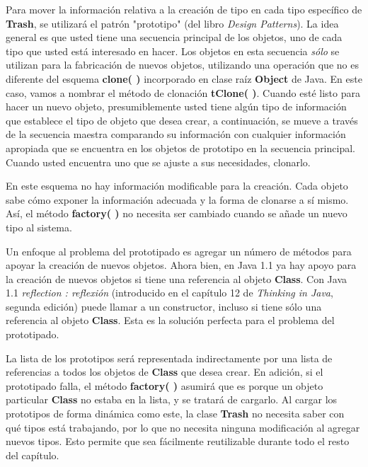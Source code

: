 \documentclass{article}
\begin{document}
Para mover la información relativa a la creación de tipo en cada tipo específico de \textbf{Trash}, se utilizará el patrón "prototipo" (del libro \textit{Design Patterns}). La idea general es que usted tiene una secuencia principal de los objetos, uno de cada tipo que usted está interesado en hacer. Los objetos en esta secuencia \textit{sólo} se utilizan para la fabricación de nuevos objetos, utilizando una operación que no es diferente del esquema \textbf{clone( )} incorporado en clase raíz \textbf{Object} de Java. En este caso, vamos a nombrar el método de clonación \textbf{tClone( )}. Cuando esté listo para hacer un nuevo objeto, presumiblemente usted tiene algún tipo de información que establece el tipo de objeto que desea crear, a continuación, se mueve a través de la secuencia maestra comparando su información con cualquier información apropiada que se encuentra en los objetos de prototipo en la secuencia principal. Cuando usted encuentra uno que se ajuste a sus necesidades, clonarlo.    \newline

En este esquema no hay información modificable para la creación. Cada objeto sabe cómo exponer la información adecuada y la forma de clonarse a sí mismo. Así, el método \textbf{factory( )} no necesita ser cambiado cuando se añade un nuevo tipo al sistema.     \newline

Un enfoque al problema del prototipado es agregar un número de métodos para apoyar la creación de nuevos objetos. Ahora bien, en Java 1.1 ya hay apoyo para la creación de nuevos objetos si tiene una referencia al objeto \textbf{Class}. Con Java 1.1 \textit{reflection :  reflexión} (introducido en el capítulo 12 de \textit{Thinking in Java}, segunda edición) puede llamar a un constructor, incluso si tiene sólo una referencia al objeto \textbf{Class}. Esta es la solución perfecta para el problema del prototipado.   \newline

La lista de los prototipos será representada indirectamente por una lista de referencias a todos los objetos de \textbf{Class} que desea crear. En adición, si el prototipado falla, el método \textbf{factory( )} asumirá que es porque un objeto particular \textbf{Class} no estaba en la lista, y se tratará de cargarlo. Al cargar los prototipos de forma dinámica como este, la clase \textbf{Trash} no necesita saber con qué tipos está trabajando, por lo que no necesita ninguna modificación al agregar nuevos tipos. Esto permite que sea fácilmente reutilizable durante todo el resto del capítulo.     \newline
\end{document}
